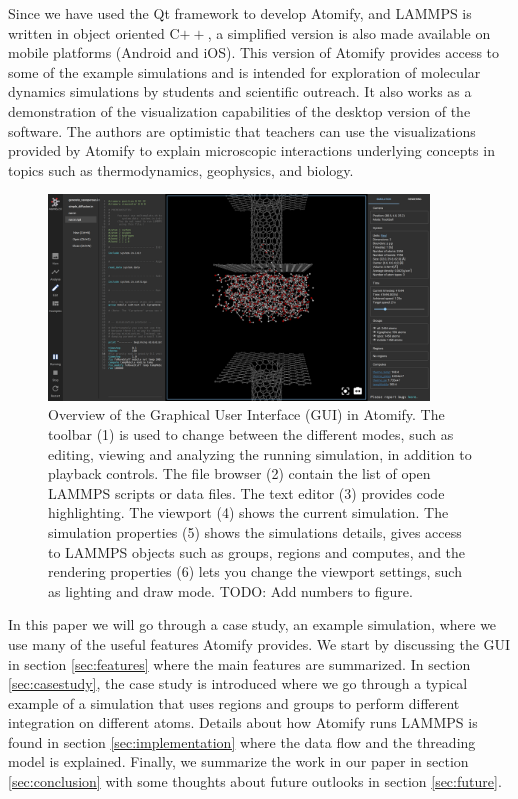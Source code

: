 \documentclass[aps,pre,twocolumn,letterpaper,floatfix,nofootinbib]{revtex4}
\newcommand*{\cpp}{C\ensuremath{++}\xspace}
\begin{document}
Since we have used the Qt framework to develop Atomify, and LAMMPS is written in object oriented \cpp, a simplified version is also made available on mobile platforms (Android and iOS).
This version of Atomify provides access to some of the example simulations and is intended for exploration of molecular dynamics simulations by students and scientific outreach.
It also works as a demonstration of the visualization capabilities of the desktop version of the software.
The authors are optimistic that teachers can use the visualizations provided by
Atomify to explain microscopic interactions underlying concepts in topics such
as thermodynamics, geophysics, and biology.

\begin{figure}
	\centering
	\includegraphics[width=0.9\textwidth]{gui.png}
	\caption{%
    Overview of the Graphical User Interface (GUI) in Atomify.
    The toolbar (1) is used to change between the different modes, such as 
    editing, viewing and analyzing the running simulation, 
    in addition to playback controls.
    The file browser (2) contain the list of open LAMMPS scripts or data files.
    The text editor (3) provides code highlighting.
    The viewport (4) shows the current simulation.
    The simulation properties (5) shows the simulations details, gives access to 
    LAMMPS objects such as groups, regions and computes, and the rendering
    properties (6) lets you change the viewport settings, such as lighting and
    draw mode.
    TODO: Add numbers to figure.
    }
	\label{fig:gui}
\end{figure}

In this paper we will go through a case study, an example simulation, where we
use many of the useful features Atomify provides.
We start by discussing the GUI in section \ref{sec:features} where the main features are summarized.
In section \ref{sec:casestudy}, the case study is introduced where we go through a typical example
of a simulation that uses regions and groups to perform different integration on different atoms.
Details about how Atomify runs LAMMPS is found in section \ref{sec:implementation} where the data flow and the threading model is explained.
Finally, we summarize the work in our paper in section \ref{sec:conclusion} with some thoughts about future outlooks in section \ref{sec:future}.
\end{document}
